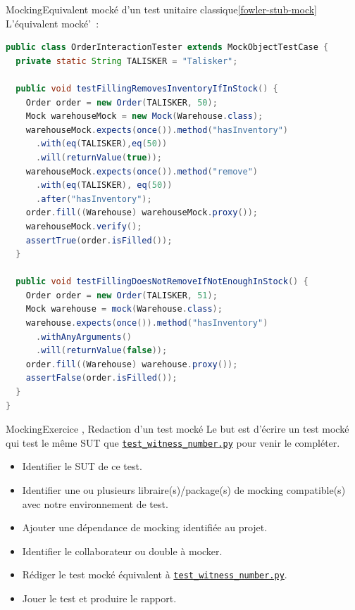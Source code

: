 \documentclass{beamer}
\begin{document}
    \begin{frame}[fragile]{Mocking}{Equivalent mocké d'un test unitaire classique\cref{fowler-stub-mock}}
        L'équivalent mocké'~:
        \begin{lstlisting}[language=Java,basicstyle=\ttfamily\tiny]
public class OrderInteractionTester extends MockObjectTestCase {
  private static String TALISKER = "Talisker";

  public void testFillingRemovesInventoryIfInStock() {
    Order order = new Order(TALISKER, 50);
    Mock warehouseMock = new Mock(Warehouse.class);
    warehouseMock.expects(once()).method("hasInventory")
      .with(eq(TALISKER),eq(50))
      .will(returnValue(true));
    warehouseMock.expects(once()).method("remove")
      .with(eq(TALISKER), eq(50))
      .after("hasInventory");
    order.fill((Warehouse) warehouseMock.proxy());
    warehouseMock.verify();
    assertTrue(order.isFilled());
  }

  public void testFillingDoesNotRemoveIfNotEnoughInStock() {
    Order order = new Order(TALISKER, 51);
    Mock warehouse = mock(Warehouse.class);
    warehouse.expects(once()).method("hasInventory")
      .withAnyArguments()
      .will(returnValue(false));
    order.fill((Warehouse) warehouse.proxy());
    assertFalse(order.isFilled());
  }
}
        \end{lstlisting}
    \end{frame}

    \begin{frame}[fragile]{Mocking}{Exercice \execcounterdispinc, Redaction d'un test mocké}
        Le but est d'écrire un test mocké qui test le même SUT que \href{https://github.com/St-Michel-IT/testing/blob/master/test_customer_database.py}{\lstinline{test_witness_number.py}} pour venir le compléter.
        \begin{itemize}
            \item Identifier le SUT de ce test.
            \item Identifier une ou plusieurs libraire(s)/package(s) de mocking compatible(s) avec notre environnement de test.
            \item Ajouter une dépendance de mocking identifiée au projet.
            \item Identifier le collaborateur ou double à mocker.
            \item Rédiger le test mocké équivalent à \href{https://github.com/St-Michel-IT/testing/blob/master/test_customer_database.py}{\lstinline{test_witness_number.py}}.
            \item Jouer le test et produire le rapport.
        \end{itemize}
    \end{frame}
\end{document}
